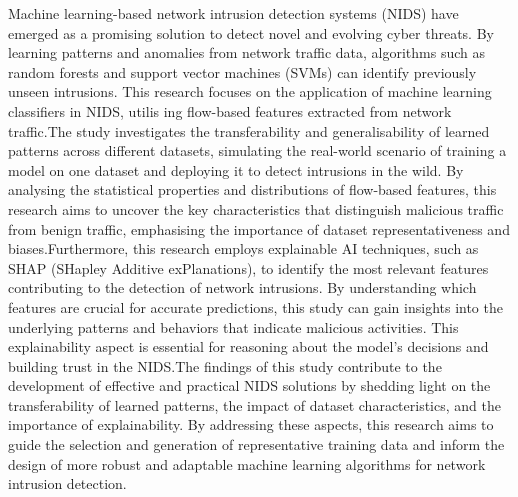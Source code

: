 Machine learning-based network intrusion detection systems (NIDS) have emerged as a promising solution to detect novel and evolving cyber threats. By learning patterns and anomalies from network traffic data, algorithms such as random forests and support vector machines (SVMs) can identify previously unseen intrusions. This research focuses on the application of machine learning classifiers in NIDS, utilis
ing flow-based features extracted from network traffic.\@ The study investigates the transferability and generalisability of learned patterns across different datasets, simulating the real-world scenario of training a model on one dataset and deploying it to detect intrusions in the wild. By analysing the statistical properties and distributions of flow-based features, this research aims to uncover the key characteristics that distinguish malicious traffic from benign traffic, emphasising the importance of dataset representativeness and biases.\@ Furthermore, this research employs explainable AI techniques, such as SHAP (SHapley Additive exPlanations), to identify the most relevant features contributing to the detection of network intrusions. By understanding which features are crucial for accurate predictions, this study can gain insights into the underlying patterns and behaviors that indicate malicious activities. This explainability aspect is essential for reasoning about the model's decisions and building trust in the NIDS.\@ The findings of this study contribute to the development of effective and practical NIDS solutions by shedding light on the transferability of learned patterns, the impact of dataset characteristics, and the importance of explainability. By addressing these aspects, this research aims to guide the selection and generation of representative training data and inform the design of more robust and adaptable machine learning algorithms for network intrusion detection.